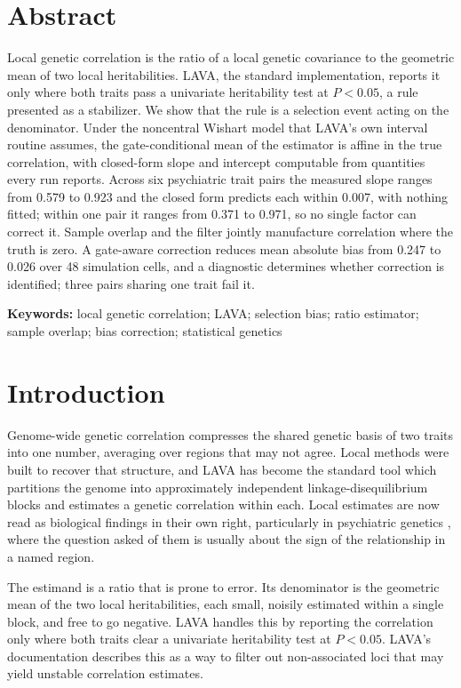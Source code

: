 \documentclass[12pt,a4paper]{article}
\begin{document}
\section*{Abstract}

Local genetic correlation is the ratio of a local genetic covariance to the geometric mean
of two local heritabilities. LAVA, the standard implementation, reports it only where both
traits pass a univariate heritability test at $P<0.05$, a rule presented as a stabilizer. We
show that the rule is a selection event acting on the denominator. Under the noncentral
Wishart model that LAVA's own interval routine assumes, the gate-conditional mean of the
estimator is affine in the true correlation, with closed-form slope and intercept computable
from quantities every run reports. Across six psychiatric trait pairs the measured slope
ranges from 0.579 to 0.923 and the closed form predicts each within 0.007, with nothing
fitted; within one pair it ranges from 0.371 to 0.971, so no single factor can correct it.
Sample overlap and the filter jointly manufacture correlation where the truth is zero. A
gate-aware correction reduces mean absolute bias from 0.247 to 0.026 over 48 simulation
cells, and a diagnostic determines whether correction is identified; three pairs sharing one
trait fail it.

\medskip
\noindent\textbf{Keywords:} local genetic correlation; LAVA; selection bias; ratio
estimator; sample overlap; bias correction; statistical genetics

\clearpage

\section{Introduction}\label{sec:intro}

Genome-wide genetic correlation compresses the shared genetic basis of two traits into one
number, averaging over regions that may not agree. Local methods were built to recover
that structure, and LAVA \citep{ref1} has become the standard tool which partitions the
genome into approximately independent linkage-disequilibrium blocks and estimates a
genetic correlation within each. Local estimates are now read as biological findings in
their own right, particularly in psychiatric genetics \citep{ref2}, where the question
asked of them is usually about the sign of the relationship in a named region.

The estimand is a ratio that is prone to error. Its denominator is the geometric mean of
the two local heritabilities, each small, noisily estimated within a single block, and
free to go negative. LAVA handles this by reporting the correlation only where both traits
clear a univariate heritability test at $P<0.05$. LAVA's documentation describes this as a
way to filter out non-associated loci that may yield unstable correlation estimates.
\end{document}

